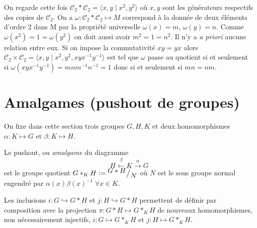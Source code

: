\documentclass[main.tex]{subfiles}
\begin{document}
	\begin{example}
		On regarde cette fois $\mathcal{C}_2*\mathcal{C}_2 = \langle x,y \;|\; x^2,y^2\rangle$ où $x,y$ sont les générateurs respectifs des copies de  $\mathcal{C}_2$.
		On a $\omega : \mathcal{C}_2 * \mathcal{C}_2 \longmapsto M$ correspond à la donnée de deux éléments d'ordre 2 dans M par la propriété universelle $\omega(x) = m$,  $\omega(y) = n$. Comme $\omega(x^2) = 1 = \omega(y^2)$ on doit aussi avoir  $m^2 = 1 = n^2$. Il n'y a \textit{a priori} aucune relation entre eux. Si on impose la commutativité  $xy = yx$ alors $\mathcal{C}_2 \times \mathcal{C}_2 = \langle x,y \;|\; x^2,y^2,xyx^{-1}y^{-1} \rangle$ est tel que $\omega$ passe au quotient si et seulement si $\omega(xyx^{-1}y^{-1}) = mnm^{-1}n^{-1} = 1$ donc si et seulement si $mn = nm$.
		\begin{center}
		\end{center}	
	\end{example}

	\section{Amalgames (pushout de groupes)}

	On fixe dans cette section trois groupes $G,H,K$ et deux homomorphismes $\alpha : K \longmapsto G$ et $\beta : K \longmapsto H$.

	\begin{definition}[Amalgame]
		Le pushout, ou \emph{amalgame} du diagramme \[
			H \overset{\beta}{\longleftarrow} K \overset{\alpha}{\longrightarrow} G
		\] est le groupe quotient $G*_K H \vcentcolon= {^{\textstyle G*H}\big/_{\textstyle N}}$ où $N$ est le sous groupe normal engendré par $\alpha(x)\beta(x)^{-1} \; \forall x \in K$.	
	\end{definition}

	\begin{remark}
		Les inclusions $i : G \hookrightarrow G*H$ et $j : H \hookrightarrow G*H$ permettent de définir par composition avec la projection $\pi : G*H \longmapsto G*_K H$ de nouveaux homomorphismes, non nécessairement injectifs, $i : G \longmapsto G*_K H$ et $ j : H \longmapsto G*_K H$.
	\end{remark}
\end{document}
